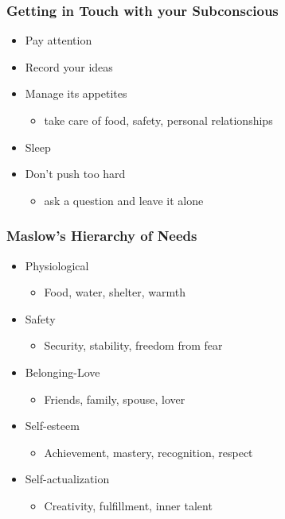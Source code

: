 \documentclass{beamer}
\begin{document}
\begin{frame}
  \frametitle{Getting in Touch with your Subconscious}

\begin{itemize}
\item Pay attention\pause
\item Record your ideas\pause
\item Manage its appetites
\begin{itemize}
\item take care of food, safety, personal relationships
\end{itemize}
\pause
\item Sleep\pause
\item Don't push too hard
\begin{itemize}
\item ask a question and leave it alone
\end{itemize}
\end{itemize}

\end{frame}


\begin{frame}
  \frametitle{Maslow's Hierarchy of Needs}

\begin{itemize}

\item Physiological
\begin{itemize}
\item Food, water, shelter, warmth
\end{itemize}

\item Safety
\begin{itemize}
\item Security, stability, freedom from fear
\end{itemize}

\item Belonging-Love
\begin{itemize}
\item Friends, family, spouse, lover
\end{itemize}

\item Self-esteem
\begin{itemize}
\item Achievement, mastery, recognition, respect
\end{itemize}

\item Self-actualization
\begin{itemize}
\item Creativity, fulfillment, inner talent
\end{itemize}

\end{itemize}

\end{frame}
\end{document}
